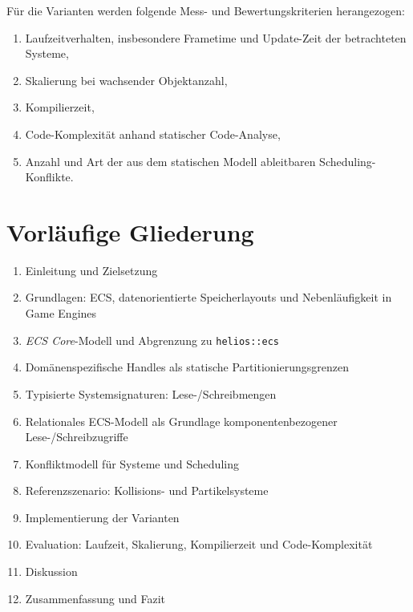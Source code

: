 Für die Varianten werden folgende Mess- und Bewertungskriterien herangezogen:

\begin{enumerate}
    \item Laufzeitverhalten, insbesondere Frametime und Update-Zeit der betrachteten Systeme,
    \item Skalierung bei wachsender Objektanzahl,
    \item Kompilierzeit,
    \item Code-Komplexität anhand statischer Code-Analyse,
    \item Anzahl und Art der aus dem statischen Modell ableitbaren Scheduling-Konflikte.
\end{enumerate}

\section{Vorläufige Gliederung}

\begin{enumerate}
    \item Einleitung und Zielsetzung
    \item Grundlagen: ECS, datenorientierte Speicherlayouts und Nebenläufigkeit in Game Engines
    \item \textit{ECS Core}-Modell und Abgrenzung zu \texttt{helios::ecs}
    \item Domänenspezifische Handles als statische Partitionierungsgrenzen
    \item Typisierte Systemsignaturen: Lese-/Schreibmengen
    \item Relationales ECS-Modell als Grundlage komponentenbezogener Lese-/Schreibzugriffe
    \item Konfliktmodell für Systeme und Scheduling
    \item Referenzszenario: Kollisions- und Partikelsysteme
    \item Implementierung der Varianten
    \item Evaluation: Laufzeit, Skalierung, Kompilierzeit und Code-Komplexität
    \item Diskussion
    \item Zusammenfassung und Fazit
\end{enumerate}